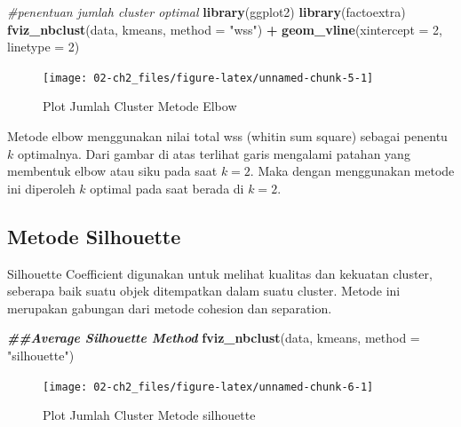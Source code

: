 \documentclass[
  oneside]{book}
\newenvironment{Shaded}{\begin{snugshade}}{\end{snugshade}}
\newcommand{\AttributeTok}[1]{\textcolor[rgb]{0.13,0.29,0.53}{#1}}
\newcommand{\CommentTok}[1]{\textcolor[rgb]{0.56,0.35,0.01}{\textit{#1}}}
\newcommand{\DecValTok}[1]{\textcolor[rgb]{0.00,0.00,0.81}{#1}}
\newcommand{\DocumentationTok}[1]{\textcolor[rgb]{0.56,0.35,0.01}{\textbf{\textit{#1}}}}
\newcommand{\FunctionTok}[1]{\textcolor[rgb]{0.13,0.29,0.53}{\textbf{#1}}}
\newcommand{\NormalTok}[1]{#1}
\newcommand{\SpecialCharTok}[1]{\textcolor[rgb]{0.81,0.36,0.00}{\textbf{#1}}}
\newcommand{\StringTok}[1]{\textcolor[rgb]{0.31,0.60,0.02}{#1}}
\begin{document}
\begin{Shaded}
\begin{Highlighting}[]
\CommentTok{\#penentuan jumlah cluster optimal}
\FunctionTok{library}\NormalTok{(ggplot2)}
\FunctionTok{library}\NormalTok{(factoextra)}
\FunctionTok{fviz\_nbclust}\NormalTok{(data, kmeans, }\AttributeTok{method =} \StringTok{"wss"}\NormalTok{) }\SpecialCharTok{+}
  \FunctionTok{geom\_vline}\NormalTok{(}\AttributeTok{xintercept =} \DecValTok{2}\NormalTok{, }\AttributeTok{linetype =} \DecValTok{2}\NormalTok{)}
\end{Highlighting}
\end{Shaded}

\begin{figure}[h]

{\centering \texttt{[image: 02-ch2\_files/figure-latex/unnamed-chunk-5-1]} 

}

\caption{Plot Jumlah Cluster Metode Elbow}\label{fig:unnamed-chunk-5}
\end{figure}

Metode elbow menggunakan nilai total wss (whitin sum square) sebagai penentu \(k\) optimalnya. Dari gambar di atas terlihat garis mengalami patahan yang membentuk elbow atau siku pada saat \(k=2\). Maka dengan menggunakan metode ini diperoleh \(k\) optimal pada saat berada di \(k=2\).

\subsection*{Metode Silhouette}\label{metode-silhouette}

Silhouette Coefficient digunakan untuk melihat kualitas dan kekuatan cluster, seberapa baik suatu objek ditempatkan dalam suatu cluster. Metode ini merupakan gabungan dari metode cohesion dan separation.

\begin{Shaded}
\begin{Highlighting}[]
\DocumentationTok{\#\#Average Silhouette Method}
\FunctionTok{fviz\_nbclust}\NormalTok{(data, kmeans, }\AttributeTok{method =} \StringTok{"silhouette"}\NormalTok{)}
\end{Highlighting}
\end{Shaded}

\begin{figure}[h]

{\centering \texttt{[image: 02-ch2\_files/figure-latex/unnamed-chunk-6-1]} 

}

\caption{Plot Jumlah Cluster Metode silhouette}\label{fig:unnamed-chunk-6}
\end{figure}
\end{document}

